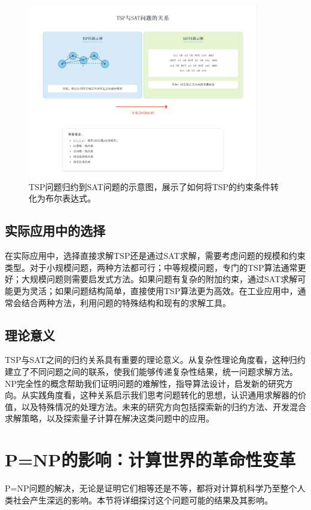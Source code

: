 \documentclass[a4paper,12pt]{ctexart}
\begin{document}
\begin{figure}[H]
    \centering
    \includegraphics[width=0.9\textwidth]{img/xxx.png}
    \caption{TSP问题归约到SAT问题的示意图，展示了如何将TSP的约束条件转化为布尔表达式。}
    \label{fig:tsp_sat_relation}
\end{figure}

\subsection{实际应用中的选择}
在实际应用中，选择直接求解TSP还是通过SAT求解，需要考虑问题的规模和约束类型。对于小规模问题，两种方法都可行；中等规模问题，专门的TSP算法通常更好；大规模问题则需要启发式方法。如果问题有复杂的附加约束，通过SAT求解可能更为灵活；如果问题结构简单，直接使用TSP算法更为高效。在工业应用中，通常会结合两种方法，利用问题的特殊结构和现有的求解工具。

\subsection{理论意义}
TSP与SAT之间的归约关系具有重要的理论意义。从复杂性理论角度看，这种归约建立了不同问题之间的联系，使我们能够传递复杂性结果，统一问题求解方法。NP完全性的概念帮助我们证明问题的难解性，指导算法设计，启发新的研究方向。从实践角度看，这种关系启示我们思考问题转化的思想，认识通用求解器的价值，以及特殊情况的处理方法。未来的研究方向包括探索新的归约方法、开发混合求解策略，以及探索量子计算在解决这类问题中的应用。

\section{P=NP的影响：计算世界的革命性变革}
P=NP问题的解决，无论是证明它们相等还是不等，都将对计算机科学乃至整个人类社会产生深远的影响。本节将详细探讨这个问题可能的结果及其影响。
\end{document}
